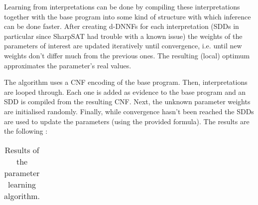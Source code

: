 

Learning from interpretations can be done by compiling these interpretations together with the base program into some kind of structure with which inference can be done faster. After creating d-DNNFs for each interpretation (SDDs in particular since SharpSAT had trouble with a known issue) the weights of the parameters of interest are updated iteratively until convergence, i.e. until new weights don't differ much from the previous ones. The resulting (local) optimum approximates the parameter's real values.\\

\par\noindent The algorithm uses a CNF encoding of the base program. Then, interpretations are looped through. Each one is added as evidence to the base program and an SDD is compiled from the resulting CNF. Next, the unknown parameter weights are initialised randomly. Finally, while convergence hasn't been reached the SDDs are used to update the parameters (using the provided formula). The results are the following :

\begin{table}[h]
\centering
\begin{tabular}{ccc}
& &\\\hline
\end{tabular}
\caption{Results of the parameter learning algorithm.}
\label{plres}
\end{table}